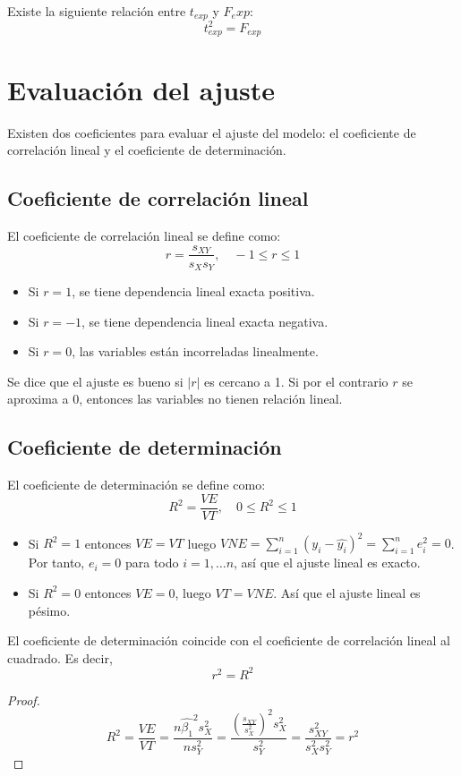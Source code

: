 \begin{remark}
    Existe la siguiente relación entre $t_{exp}$ y $F_exp$:
    $$t_{exp}^2 = F_{exp}$$
\end{remark}

\section{Evaluación del ajuste}
Existen dos coeficientes para evaluar el ajuste del modelo: el coeficiente de correlación lineal y el coeficiente de determinación.

\subsection*{Coeficiente de correlación lineal}
El coeficiente de correlación lineal se define como:
$$r = \frac{s_{XY}}{s_X s_Y}, \quad -1 \leq r \leq 1$$
\begin{itemize}
    \item Si $r = 1$, se tiene dependencia lineal exacta positiva.
    \item Si $r = -1$, se tiene dependencia lineal exacta negativa.
    \item Si $r = 0$, las variables están incorreladas linealmente.
\end{itemize}
Se dice que el ajuste es bueno si $|r|$ es cercano a 1.
Si por el contrario $r$ se aproxima a 0, entonces las variables no tienen relación lineal.

\subsection*{Coeficiente de determinación}
El coeficiente de determinación se define como:
$$R^2 = \frac{VE}{VT}, \quad 0 \leq R^2 \leq 1$$
\begin{itemize}
    \item Si $R^2 = 1$ entonces $VE = VT$ luego $VNE = \sum_{i=1}^n (y_i - \hat{y_i})^2 = \sum_{i=1}^n e_i^2 = 0$.
          Por tanto, $e_i = 0$ para todo $i = 1, \dots n$, así que el ajuste lineal es exacto.
    \item Si $R^2 = 0$ entonces $VE = 0$, luego $VT = VNE$.
          Así que el ajuste lineal es pésimo.
\end{itemize}

\begin{theorem}
    El coeficiente de determinación coincide con el coeficiente de correlación lineal al cuadrado.
    Es decir, $$r^2 = R^2$$

    \begin{proof}
        $$R^2 = \frac{VE}{VT} = \frac{n\hat{\beta_1}^2s_X^2}{ns_Y^2} = \frac{\left(\frac{s_{XY}}{s_X^2}\right)^2 s_X^2}{s_Y^2} = \frac{s_{XY}^2}{s_X^2 s_Y^2} = r^2$$
    \end{proof}
\end{theorem}

